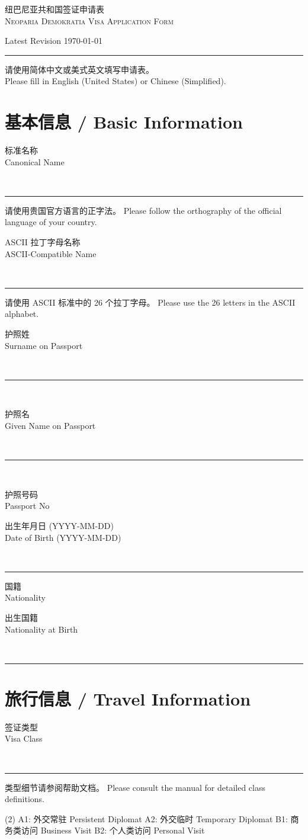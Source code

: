 \documentclass[a4paper,10pt]{article}
\newcommand{\inforow}[2]{
    \begin{minipage}{\linewidth}
        \vspace{3pt}
        \infocell{#1}{#2}\\
        \vspace{3pt}
        \hrule
        \vspace{5pt}
    \end{minipage}\\
}
\newcommand{\inforowDuo}[4]{
    \vspace{3pt}
    \begin{minipage}{0.5\linewidth-4pt}
        \infocell{#1}{#2}
    \end{minipage}
    \hfill
    \begin{minipage}{0.5\linewidth-4pt}
        \infocell{#3}{#4}
    \end{minipage}\\
    \vspace{3pt}
    \hrule
    \vspace{5pt}
}
\newcommand{\infocell}[2]{
    \begin{minipage}{\linewidth}
        #1\\
        {\fontsize{7.5pt}{8pt}\selectfont#2}
    \end{minipage}
}
\newcommand{\inforowbig}[4]{
    \vspace{3pt}
    \infocell{#1}{#2}\\
    \vspace{3pt}
    \hrule
    \vspace{2pt}
    {\fontsize{8pt}{10pt}\selectfont#3 {\fontsize{7.5pt}{10pt}\selectfont#4}}
    \vspace{7pt}\par
}
\begin{document}
\sffamily
\pagestyle{empty}

\begin{minipage}{\linewidth}
	\center
    \rmfamily
    \scshape
	\Large
	纽巴尼亚共和国签证申请表\\
    Neoparia Demokratia Visa Application Form

	\vspace{4pt}
    \ttfamily
	\normalsize
	Latest Revision \today
\end{minipage}

\vspace{10pt}
\hrule
\vspace{5pt}

\begin{minipage}{\linewidth}
	请使用简体中文或美式英文填写申请表。\\
	Please fill in English (United States) or Chinese (Simplified).
\end{minipage}


\fontsize{9pt}{10pt}\selectfont

\section{基本信息 / Basic Information}

\inforowbig{标准名称}{Canonical Name}{请使用贵国官方语言的正字法。}{Please follow the orthography of the official language of your country.}
\inforowbig{ASCII 拉丁字母名称}{ASCII-Compatible Name}{请使用 ASCII 标准中的 26 个拉丁字母。}{Please use the 26 letters in the ASCII alphabet.}
\inforow{护照姓}{Surname on Passport}
\inforow{护照名}{Given Name on Passport}
\inforowDuo{护照号码}{Passport No}{出生年月日 (YYYY-MM-DD)}{Date of Birth (YYYY-MM-DD)}
\inforowDuo{国籍}{Nationality}{出生国籍}{Nationality at Birth}

\section{旅行信息 / Travel Information}

\inforowbig{签证类型}{Visa Class}{类型细节请参阅帮助文档。}{Please consult the manual for detailed class definitions.}

\begin{tasks}[label=,after-item-skip=0pt,item-indent=0pt](2)
    \task A1: 外交常驻 Persistent Diplomat
    \task A2: 外交临时 Temporary Diplomat
    \task B1: 商务类访问 Business Visit
    \task B2: 个人类访问 Personal Visit
\end{tasks}
\end{document}
